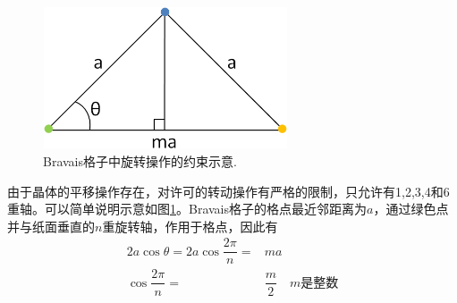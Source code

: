\begin{figure}[h!]
\centering
\vspace*{-0.05in}
\includegraphics[height=1.65in,width=2.85in,viewport=0 0 510 297,clip]{Figures/Crystallographic_restriction_2.png}
\caption{\small \textrm{Bravais格子中旋转操作的约束示意.}}%
\label{Fig:Crystallographic_restriction}
\end{figure}
由于晶体的平移操作存在，对许可的转动操作有严格的限制，只允许有1,2,3,4和6重轴。可以简单说明示意如图\ref{Fig:Crystallographic_restriction}。Bravais格子的格点最近邻距离为$a$，通过绿色点并与纸面垂直的$n$重旋转轴，作用于格点，因此有
\begin{displaymath}
	\begin{aligned}
		2a\cos\theta=2a\cos\dfrac{2\pi}n=&ma\\
		\cos\dfrac{2\pi}n=&\dfrac{m}2\quad m\mbox{是整数}
	\end{aligned}
\end{displaymath}
